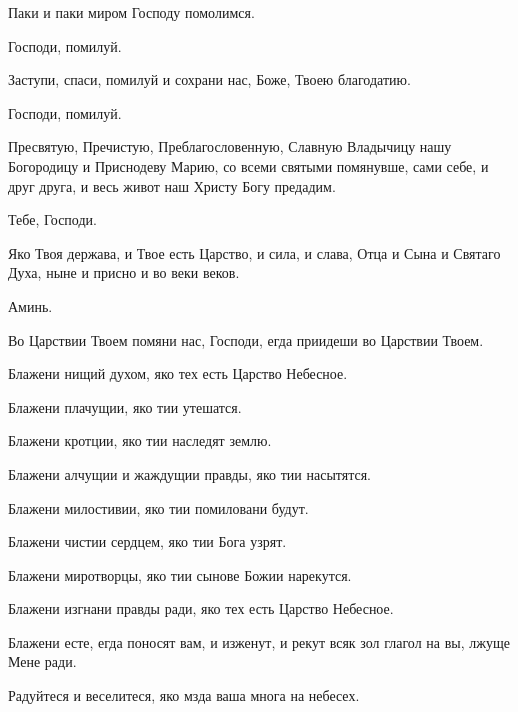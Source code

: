 \begin{mymulticols}

 Паки и паки миром Господу помолимся. 

 Господи, помилуй. 

 Заступи, спаси, помилуй и сохрани нас, Боже, Твоею благодатию. 

 Господи, помилуй. 

 Пресвятую, Пречистую, Преблагословенную, Славную Владычицу нашу Богородицу и Приснодеву Марию, со всеми святыми помянувше, сами себе, и друг друга, и весь живот наш Христу Богу предадим.

 Тебе, Господи. 

 Яко Твоя держава, и Твое есть Царство, и сила, и слава, Отца и Сына и Святаго Духа, ныне и присно и во веки веков. 

 Аминь.



 Во Царствии Твоем помяни нас, Господи, егда приидеши во Царствии Твоем. 

 Блажени нищий духом, яко тех есть Царство Небесное. 

 Блажени плачущии, яко тии утешатся.

 Блажени кротции, яко тии наследят землю. 

 Блажени алчущии и жаждущии правды, яко тии насытятся.

 Блажени милостивии, яко тии помиловани будут. 

 Блажени чистии сердцем, яко тии Бога узрят.

 Блажени миротворцы, яко тии сынове Божии нарекутся. 

 Блажени изгнани правды ради, яко тех есть Царство Небесное.

 Блажени есте, егда поносят вам, и изженут, и рекут всяк зол глагол на вы, лжуще Мене ради. 

 Радуйтеся и веселитеся, яко мзда ваша многа на небесех. 


\end{mymulticols}
